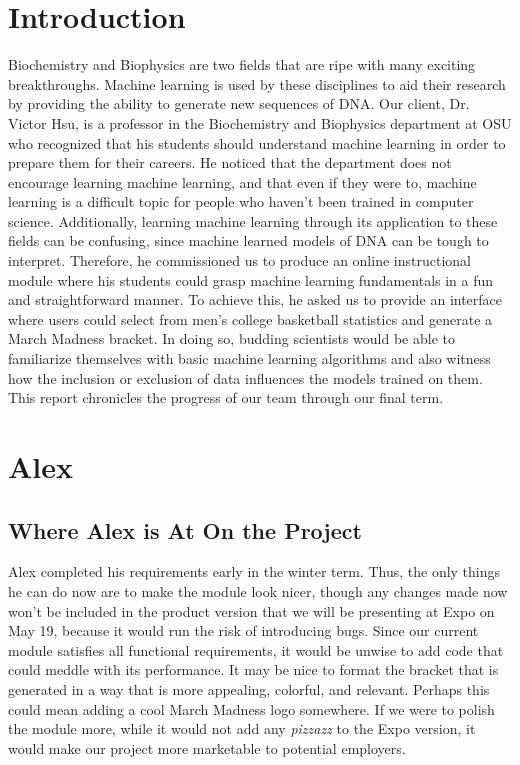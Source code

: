 \documentclass[onecolumn, draftclsnofoot,10pt, compsoc]{IEEEtran}
\begin{document}
\section{Introduction}
Biochemistry and Biophysics are two fields that are ripe with many exciting breakthroughs. Machine learning is used by these disciplines to aid their research by providing the ability to generate new sequences of DNA. Our client, Dr. Victor Hsu, is a professor in the Biochemistry and Biophysics department at OSU who recognized that his students should understand machine learning in order to prepare them for their careers. He noticed that the department does not encourage learning machine learning, and that even if they were to, machine learning is a difficult topic for people who haven't been trained in computer science. Additionally, learning machine learning through its application to these fields can be confusing, since machine learned models of DNA can be tough to interpret. Therefore, he commissioned us to produce an online instructional module where his students could grasp machine learning fundamentals in a fun and straightforward manner. To achieve this, he asked us to provide an interface where users could select from men's college basketball statistics and generate a March Madness bracket. In doing so, budding scientists would be able to familiarize themselves with basic machine learning algorithms and also witness how the inclusion or exclusion of data influences the models trained on them. This report chronicles the progress of our team through our final term.

\section{Alex}

\subsection{Where Alex is At On the Project}
Alex completed his requirements early in the winter term. Thus, the only things he can do now are to make the module look nicer, though any changes made now won't be included in the product version that we will be presenting at Expo on May 19, because it would run the risk of introducing bugs. Since our current module satisfies all functional requirements, it would be unwise to add code that could meddle with its performance. It may be nice to format the bracket that is generated in a way that is more appealing, colorful, and relevant. Perhaps this could mean adding a cool March Madness logo somewhere. If we were to polish the module more, while it would not add any \emph{pizzazz} to the Expo version, it would make our project more marketable to potential employers.
\end{document}
